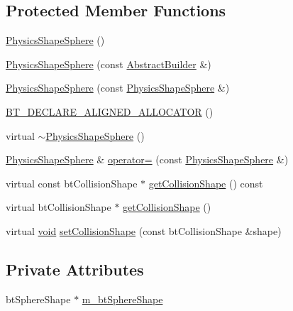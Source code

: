 \subsection*{Protected Member Functions}
\begin{DoxyCompactItemize}
\item 
\mbox{\hyperlink{classnjli_1_1_physics_shape_sphere_a692e7b24fc48ddbf8301c9ea47cbbda0}{Physics\+Shape\+Sphere}} ()
\item 
\mbox{\hyperlink{classnjli_1_1_physics_shape_sphere_a29f4ba9f9895e3c567f44d349a862e4c}{Physics\+Shape\+Sphere}} (const \mbox{\hyperlink{classnjli_1_1_abstract_builder}{Abstract\+Builder}} \&)
\item 
\mbox{\hyperlink{classnjli_1_1_physics_shape_sphere_a5aa1eb28266234195f2d4d7cf2adba12}{Physics\+Shape\+Sphere}} (const \mbox{\hyperlink{classnjli_1_1_physics_shape_sphere}{Physics\+Shape\+Sphere}} \&)
\item 
\mbox{\hyperlink{classnjli_1_1_physics_shape_sphere_a571bd26716c2cd08198e44b370c2a8ee}{B\+T\+\_\+\+D\+E\+C\+L\+A\+R\+E\+\_\+\+A\+L\+I\+G\+N\+E\+D\+\_\+\+A\+L\+L\+O\+C\+A\+T\+OR}} ()
\item 
virtual \mbox{\hyperlink{classnjli_1_1_physics_shape_sphere_a74fea8aee27ee089581029b2368dddd7}{$\sim$\+Physics\+Shape\+Sphere}} ()
\item 
\mbox{\hyperlink{classnjli_1_1_physics_shape_sphere}{Physics\+Shape\+Sphere}} \& \mbox{\hyperlink{classnjli_1_1_physics_shape_sphere_af3ff5bdb2cbd09f32eb3158a4eb04c56}{operator=}} (const \mbox{\hyperlink{classnjli_1_1_physics_shape_sphere}{Physics\+Shape\+Sphere}} \&)
\item 
virtual const bt\+Collision\+Shape $\ast$ \mbox{\hyperlink{classnjli_1_1_physics_shape_sphere_a75ab9287d8f5c36ea782f4b7fb9535d6}{get\+Collision\+Shape}} () const
\item 
virtual bt\+Collision\+Shape $\ast$ \mbox{\hyperlink{classnjli_1_1_physics_shape_sphere_a8929b088f8eac7b80215679f24da1abe}{get\+Collision\+Shape}} ()
\item 
virtual \mbox{\hyperlink{_thread_8h_af1e856da2e658414cb2456cb6f7ebc66}{void}} \mbox{\hyperlink{classnjli_1_1_physics_shape_sphere_a6c4f6e4cd8f796892bce7c3c09f0d14b}{set\+Collision\+Shape}} (const bt\+Collision\+Shape \&shape)
\end{DoxyCompactItemize}
\subsection*{Private Attributes}
\begin{DoxyCompactItemize}
\item 
bt\+Sphere\+Shape $\ast$ \mbox{\hyperlink{classnjli_1_1_physics_shape_sphere_aeb4452f79c06b476a09bc23980abec57}{m\+\_\+bt\+Sphere\+Shape}}
\end{DoxyCompactItemize}
